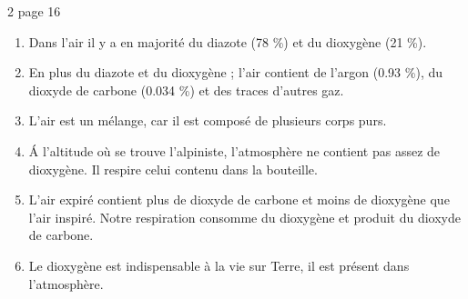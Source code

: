 \begin{myact}{2 page 16}
	\begin{enumerate}
		\item Dans l'air il y a en majorité du diazote (78 \%) et du dioxygène (21 \%).\pause
		\item En plus du diazote et du dioxygène ; l'air contient de l'argon (\num{0.93} \%), du dioxyde de carbone (\num{0.034} \%) et des traces d'autres gaz.\pause
		\item L'air est un mélange, car il est composé de plusieurs corps purs.\pause
		\item \'A l'altitude où se trouve l'alpiniste, l'atmosphère ne contient pas assez de dioxygène. Il respire celui contenu dans la bouteille.\pause
		\item L'air expiré contient plus de dioxyde de carbone  et moins de dioxygène que l'air inspiré. Notre respiration consomme du dioxygène et produit du dioxyde de carbone.\pause
		\item Le dioxygène est indispensable à la vie sur Terre, il est présent dans l'atmosphère. 
	\end{enumerate}
\end{myact}